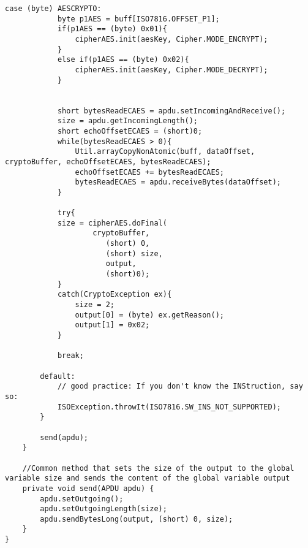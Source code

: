 \begin{lstlisting}[caption=SecureCard.java.,breaklines=true,breakatwhitespace=false, label=lst:SecureCard,escapechar=!]
		case (byte) AESCRYPTO:
			byte p1AES = buff[ISO7816.OFFSET_P1];
			if(p1AES == (byte) 0x01){
				cipherAES.init(aesKey, Cipher.MODE_ENCRYPT);
			}
			else if(p1AES == (byte) 0x02){
				cipherAES.init(aesKey, Cipher.MODE_DECRYPT);
			}


			short bytesReadECAES = apdu.setIncomingAndReceive();
			size = apdu.getIncomingLength();
			short echoOffsetECAES = (short)0;
			while(bytesReadECAES > 0){
				Util.arrayCopyNonAtomic(buff, dataOffset, cryptoBuffer, echoOffsetECAES, bytesReadECAES);
				echoOffsetECAES += bytesReadECAES;
				bytesReadECAES = apdu.receiveBytes(dataOffset);
			}

			try{
			size = cipherAES.doFinal(
					cryptoBuffer,
		               (short) 0,
		               (short) size,
		               output,
		               (short)0);
			}
			catch(CryptoException ex){
				size = 2;
				output[0] = (byte) ex.getReason();
				output[1] = 0x02;
			}

			break;

		default:
			// good practice: If you don't know the INStruction, say so:
			ISOException.throwIt(ISO7816.SW_INS_NOT_SUPPORTED);
		}

		send(apdu);
	}

	//Common method that sets the size of the output to the global variable size and sends the content of the global variable output
	private void send(APDU apdu) {
		apdu.setOutgoing();
		apdu.setOutgoingLength(size);
		apdu.sendBytesLong(output, (short) 0, size);
	}
}
\end{lstlisting}
